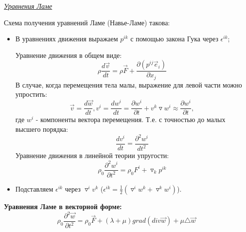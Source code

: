 \begin{center}
  \textit{\underline{Уравнения Ламе}}
\end{center}
\quad Схема получения уравнений Ламе (Навье-Ламе) такова:
\begin{itemize}
  \item В уравнениях движения выражаем $p^{ik}$ с помощью закона Гука через $\epsilon^{ik}$;

        Уравнение движения в общем виде: $$\rho\frac{d\vec{v}}{dt} = \rho \vec{F} + \frac{\partial (p^{ij}\vec{e}_i)}{\partial x_j}$$
        В случае, когда перемещения тела малы, выражение для левой части можно упростить: $$\vec{v} = \frac{d \vec{w}}{dt}, v^i = \frac{d w^i}{dt} = \frac{\partial w^i}{\partial t} + v^k \triangledown w^i \approx \frac{\partial w^i}{\partial t},$$
        где $w^i$ - компоненты вектора перемещения. Т.е. с точностью до малых высшего порядка: $$\frac{d v^i}{dt} = \frac{\partial^2 w^i}{dt^2}$$
        Уравнение движения в линейной теории упругости: $$\rho_0\frac{\partial^2 w^i}{\partial t^2} = \rho_0 F^i + \triangledown_k p^{ik}$$
  \item Подставляем $\epsilon^{ik}$ через $\triangledown^i v^k$ ($\epsilon^{ik} = \frac{1}{2}(\triangledown^i w^k + \triangledown^k w^i)$).
\end{itemize}

\textbf{Уравнения Ламе в векторной форме:} $$\rho_0\frac{\partial^2 \vec{w}}{\partial t^2} = \rho_0\vec{F} + (\lambda + \mu)grad(div\vec{w}) + \mu \triangle \vec{w}$$

